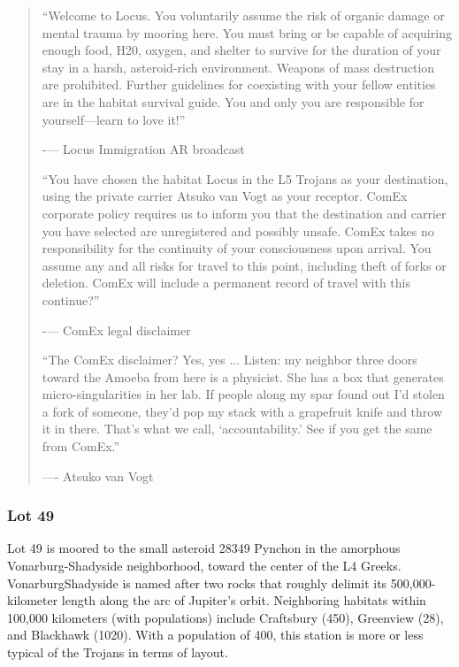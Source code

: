 \begin{quotation}
  “Welcome to Locus. You voluntarily assume the risk of organic damage
  or mental trauma by mooring here. You must bring or be capable of
  acquiring enough food, H20, oxygen, and shelter to survive for the
  duration of your stay in a harsh, asteroid-rich environment.
  Weapons of mass destruction are prohibited. Further guidelines for
  coexisting with your fellow entities are in the habitat survival
  guide. You and only you are responsible for yourself—learn to love
  it!”

  -— Locus Immigration AR broadcast

  “You have chosen the habitat Locus in the L5 Trojans as your
  destination, using the private carrier Atsuko van Vogt as your
  receptor. ComEx corporate policy requires us to inform you that the
  destination and carrier you have selected are unregistered and
  possibly unsafe.  ComEx takes no responsibility for the continuity
  of your consciousness upon arrival. You assume any and all risks for
  travel to this point, including theft of forks or deletion. ComEx
  will include a permanent record of travel with this continue?”

  -— ComEx legal disclaimer

  “The ComEx disclaimer? Yes, yes ... Listen: my neighbor three doors
  toward the Amoeba from here is a physicist.  She has a box that
  generates micro-singularities in her lab. If people along my spar
  found out I’d stolen a fork of someone, they’d pop my stack with a
  grapefruit knife and throw it in there.  That’s what we call,
  ‘accountability.’ See if you get the same from ComEx.”

  —- Atsuko van Vogt
\end{quotation}

\subsubsection{Lot 49}
\label{sec:lot-49}

Lot 49 is moored to the small asteroid 28349 Pynchon in the amorphous
Vonarburg-Shadyside neighborhood, toward the center of the L4
Greeks. VonarburgShadyside is named after two rocks that roughly
delimit its 500,000-kilometer length along the arc of Jupiter's
orbit. Neighboring habitats within 100,000 kilometers (with
populations) include Craftsbury (450), Greenview (28), and Blackhawk
(1020). With a population of 400, this station is more or less typical
of the Trojans in terms of layout.

